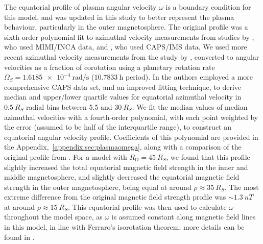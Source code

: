 The equatorial profile of plasma angular velocity $\omega$ is a boundary condition for this model, and was updated in this study to better represent the plasma behaviour, particularly in the outer magnetosphere. The original profile was a sixth-order polynomial fit to azimuthal velocity measurements from studies by \citet{kane2008}, who used MIMI/INCA data, and \citet{wilson2008}, who used CAPS/IMS data. We used more recent azimuthal velocity measurements from the study by \citet{wilson2017}, converted to angular velocities as a fraction of corotation using a planetary rotation rate $\Omega_S = \SI{1.6185e-4}{\radian\per\second}$ ($\SI{10.7833}{\hour}$ period). In \citet{wilson2017} the authors employed a more comprehensive CAPS data set, and an improved fitting technique, to derive median and upper/lower quartile values for equatorial azimuthal velocity in $\SI{0.5}{R_S}$ radial bins between 5.5 and $\SI{30}{R_S}$. We fit the median values of median azimuthal velocities with a fourth-order polynomial, with each point weighted by the error (assumed to be half of the interquartile range), to construct an equatorial angular velocity profile. Coefficients of this polynomial are provided in the Appendix,~\ref{appendix:sec:plasmaomega}, along  with a comparison of the original profile from \citet{achilleos2010a}. For a model with $R_\mathrm{D} = \SI{45}{R_S}$, we found that this profile slightly increased the total equatorial magnetic field strength in the inner and middle magnetosphere, and slightly decreased the equatorial magnetic field strength in the outer magnetosphere, being equal at around $\rho\approx\SI{35}{R_S}$. The most extreme difference from the original magnetic field strength profile was ${\sim}\SI{1.3}{nT}$ at around $\rho\approx\SI{15}{R_S}$. This equatorial profile was then used to calculate $\omega$ throughout the model space, as $\omega$ is assumed constant along magnetic field lines in this model, in line with Ferraro's isorotation theorem; more details can be found in {\citet{achilleos2010a,caudal1986}}.

